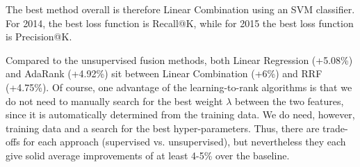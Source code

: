 \begin{table}
\centering
\caption{Comparison between the best fusion methods --- absolute P@10 percent improvements for each of the four query runs
(Summaries 2014, Descriptions 2014, Summaries 2015, Descriptions 2015).}
\label{fusion-comp}
\end{table}

The best method overall is therefore Linear Combination using an SVM classifier. For 2014, the best loss function
is Recall@K, while for 2015 the best loss function is Precision@K.

Compared to the unsupervised fusion methods, both Linear Regression (+5.08\%) and AdaRank (+4.92\%) sit between
Linear Combination (+6\%) and RRF (+4.75\%). Of course, one advantage of the learning-to-rank algorithms
is that we do not need to manually search for the best weight $\lambda$ between the two features,
since it is automatically determined
from the training data.
We do need, however, training data and a search for the best hyper-parameters.
Thus, there are trade-offs for each approach (supervised vs. unsupervised),
but nevertheless they each give solid average improvements of at least 4-5\% over the baseline.

